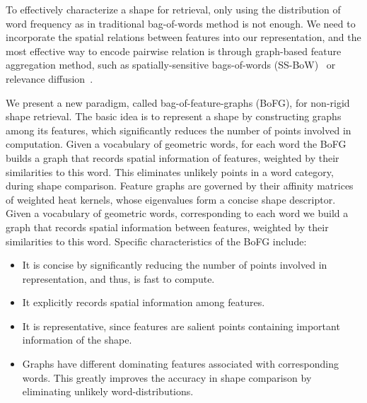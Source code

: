 
To effectively characterize a shape for retrieval, only using the distribution of word frequency as in
traditional bag-of-words method is not enough. We need to incorporate the spatial relations
between features into our representation, and the most effective way to encode pairwise
relation is through graph-based feature aggregation method, such as spatially-sensitive
bags-of-words (SS-BoW)~\cite{Bronstein2011} or relevance diffusion~\cite{Furuya2015}.

We present a new paradigm, called bag-of-feature-graphs (BoFG), for non-rigid shape retrieval. 
The basic idea is to represent a shape by constructing graphs among its features, which significantly 
reduces the number of points involved in computation. Given a vocabulary of geometric words, for each 
word the BoFG builds a graph that records spatial information of features, weighted by their similarities 
to this word. This eliminates unlikely points in a word category, during shape comparison. Feature graphs 
are governed by their affinity matrices of weighted heat kernels, whose eigenvalues form a concise shape 
descriptor. Given a vocabulary of geometric words, corresponding to each word we build a graph that records 
spatial information between features, weighted by their similarities to this word. Specific characteristics 
of the BoFG include:

\begin{itemize}
\item It is concise by significantly reducing the number of points involved in 
      representation, and thus, is fast to compute.
\item It explicitly records spatial information among features.
\item It is representative, since features are salient points containing 
      important information of the shape.
\item Graphs have different dominating features associated with corresponding 
      words. This greatly improves the accuracy in shape comparison by 
      eliminating unlikely word-distributions.
\end{itemize}

